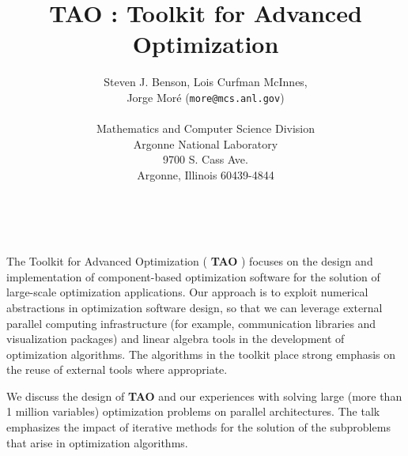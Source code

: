 \documentclass[11pt]{article}
\date{ ~ \hspace{-4mm}}
\title{{\bf  TAO } : Toolkit for Advanced Optimization  }
\author{Steven J. Benson, Lois Curfman McInnes, \\ Jorge  Mor\'{e} ({\tt more@mcs.anl.gov}) \\ \\ Mathematics and Computer Science Division  \\                                Argonne National Laboratory  \\                9700 S. Cass Ave.  \\                          Argonne, Illinois 60439-4844}
\begin{document}
\maketitle
\thispagestyle{empty}





 



The Toolkit for Advanced Optimization (
{\bf 
TAO
}
)
focuses on the design 
and implementation of component-based optimization software for the
solution of large-scale optimization applications.  Our
approach is to
exploit numerical abstractions in optimization software
design, so that we can leverage external parallel computing
infrastructure (for example, communication libraries and visualization
packages) and linear algebra tools in the
development of optimization algorithms. The algorithms in the toolkit
place strong emphasis on the reuse of external tools where appropriate.




We discuss the design of
{\bf 
TAO
}
and our experiences
with solving large (more than 1 million variables) optimization problems
on parallel architectures. The talk emphasizes the impact of
iterative methods for the solution of the subproblems that
arise in optimization algorithms.
\end{document}
